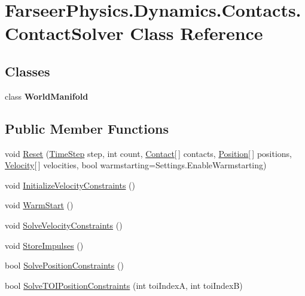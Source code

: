 \hypertarget{class_farseer_physics_1_1_dynamics_1_1_contacts_1_1_contact_solver}{\section{Farseer\+Physics.\+Dynamics.\+Contacts.\+Contact\+Solver Class Reference}
\label{class_farseer_physics_1_1_dynamics_1_1_contacts_1_1_contact_solver}
}
\subsection*{Classes}
\begin{DoxyCompactItemize}
\item 
class {\bfseries World\+Manifold}
\end{DoxyCompactItemize}
\subsection*{Public Member Functions}
\begin{DoxyCompactItemize}
\item 
void \hyperlink{class_farseer_physics_1_1_dynamics_1_1_contacts_1_1_contact_solver_abc0cbdfd07f0243d6cf8f8a605aaf950}{Reset} (\hyperlink{struct_farseer_physics_1_1_dynamics_1_1_time_step}{Time\+Step} step, int count, \hyperlink{class_farseer_physics_1_1_dynamics_1_1_contacts_1_1_contact}{Contact}\mbox{[}$\,$\mbox{]} contacts, \hyperlink{struct_farseer_physics_1_1_dynamics_1_1_position}{Position}\mbox{[}$\,$\mbox{]} positions, \hyperlink{struct_farseer_physics_1_1_dynamics_1_1_velocity}{Velocity}\mbox{[}$\,$\mbox{]} velocities, bool warmstarting=Settings.\+Enable\+Warmstarting)
\item 
void \hyperlink{class_farseer_physics_1_1_dynamics_1_1_contacts_1_1_contact_solver_a5d5473b7500fc2198b8744c04c86b332}{Initialize\+Velocity\+Constraints} ()
\item 
void \hyperlink{class_farseer_physics_1_1_dynamics_1_1_contacts_1_1_contact_solver_a9f084f4d3ace03015beeab4e750e6350}{Warm\+Start} ()
\item 
void \hyperlink{class_farseer_physics_1_1_dynamics_1_1_contacts_1_1_contact_solver_a191e151ef7bd0d8e0f1b76c1d31ec5d0}{Solve\+Velocity\+Constraints} ()
\item 
void \hyperlink{class_farseer_physics_1_1_dynamics_1_1_contacts_1_1_contact_solver_a26526c78fadf8aa493d0e2ad9c9637c1}{Store\+Impulses} ()
\item 
bool \hyperlink{class_farseer_physics_1_1_dynamics_1_1_contacts_1_1_contact_solver_a00a8f27b9d4ed2e675da6ffbb0792580}{Solve\+Position\+Constraints} ()
\item 
bool \hyperlink{class_farseer_physics_1_1_dynamics_1_1_contacts_1_1_contact_solver_ad7b1b321ef2a539aa57a9e3e7f5c44f3}{Solve\+T\+O\+I\+Position\+Constraints} (int toi\+Index\+A, int toi\+Index\+B)
\end{DoxyCompactItemize}
